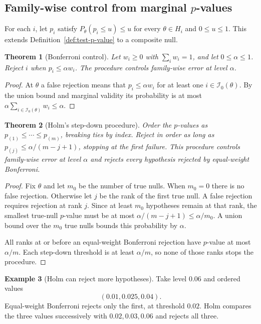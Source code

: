\documentclass[11pt,oneside]{book}
\newtheorem{theorem}{Theorem}[chapter]
\theoremstyle{definition}
\newtheorem{example}[theorem]{Example}
\theoremstyle{remark}
\begin{document}
\subsection{Family-wise control from marginal \texorpdfstring{$p$}{p}-values}
\label{subsec:bonferroni-holm}

For each $i$, let $p_i$ satisfy $P_\theta(p_i\leq u)\leq u$
for every $\theta\in H_i$ and $0\leq u\leq1$. This extends
Definition~\ref{def:test-p-value} to a composite null.

\begin{theorem}[Bonferroni control]
\label{thm:bonferroni-control}
Let $w_i\geq0$ with $\sum_i w_i=1$, and let $0\leq\alpha\leq1$.
Reject $i$ when $p_i\leq\alpha w_i$. The procedure controls
family-wise error at level $\alpha$.
\end{theorem}
\begin{proof}
At $\theta$ a false rejection means that
$p_i\leq\alpha w_i$ for at least one $i\in\mathcal I_0(\theta)$.
By the union bound and marginal validity its probability is at
most $\alpha\sum_{i\in\mathcal I_0(\theta)}w_i\leq\alpha$.
\end{proof}

\begin{theorem}[Holm's step-down procedure]
\label{thm:holm-control}
Order the $p$-values as $p_{(1)}\leq\cdots\leq p_{(m)}$,
breaking ties by index. Reject in order as long as
$p_{(j)}\leq\alpha/(m-j+1)$, stopping at the first failure.
This procedure controls family-wise error at level $\alpha$
and rejects every hypothesis rejected by equal-weight Bonferroni.
\end{theorem}
\begin{proof}
Fix $\theta$ and let $m_0$ be the number of true nulls.
When $m_0=0$ there is no false rejection. Otherwise let $j$
be the rank of the first true null. A false rejection requires
rejection at rank $j$. Since at least $m_0$ hypotheses remain
at that rank, the smallest true-null $p$-value must be at most
$\alpha/(m-j+1)\leq\alpha/m_0$. A union bound over the $m_0$
true nulls bounds this probability by $\alpha$.

All ranks at or before an equal-weight Bonferroni rejection
have $p$-value at most $\alpha/m$. Each step-down threshold
is at least $\alpha/m$, so none of those ranks stops the
procedure.
\end{proof}

\begin{example}[Holm can reject more hypotheses]
\label{ex:holm-extra-rejections}
Take level $0.06$ and ordered values
\[(0.01,0.025,0.04).\]
Equal-weight Bonferroni rejects only the first, at threshold
$0.02$. Holm compares the three values successively with
$0.02,0.03,0.06$ and rejects all three.
\end{example}
\end{document}
